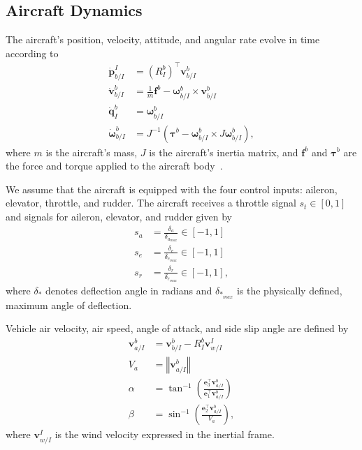 \documentclass{article}
\newcommand{\norm}[1]{\left\Vert{#1}\right\Vert}
\begin{document}
\begin{appendices}
	
\section{Aircraft Dynamics}
\label{sec:dynamics}

The aircraft's position, velocity, attitude, and angular rate evolve in time according to
\begin{align}
\dot{\mathbf{p}}_{b/I}^{I} & =\left(R_{I}^{b}\right)^{\top}\mathbf{v}_{b/I}^{b}\label{eq:lqr_pdot_true}\\
\dot{\mathbf{v}}_{b/I}^{b} & =\frac{1}{m}\mathbf{f}^{b}-\boldsymbol{\omega}_{b/I}^{b}\times\mathbf{v}_{b/I}^{b}\label{eq:lqr_vdot_true}\\
\dot{\mathbf{q}}_{I}^{b} & =\boldsymbol{\omega}_{b/I}^{b}\label{eq:lqr_qdot_true}\\
\dot{\boldsymbol{\omega}}_{b/I}^{b} & =J^{-1}\left(\boldsymbol{\tau}^{b}-\boldsymbol{\omega}_{b/I}^{b}\times J\boldsymbol{\omega}_{b/I}^{b}\right),\label{eq:lqr_omegadot_true}
\end{align}
where $m$ is the aircraft's mass, $J$ is the aircraft's inertia matrix, and $\mathbf{f}^b$ and $\boldsymbol{\tau}^b$ are the force and torque applied to the aircraft body~\cite{beard2012small}.

We assume that the aircraft is equipped with the four control inputs: aileron, elevator, throttle, and rudder.
The aircraft receives a throttle signal $s_t\in\left[0,1\right]$ and signals for aileron, elevator, and rudder given by
\begin{align}
s_{a} &= \frac{\delta_{a}}{\delta_{a_{max}}}\in\left[-1,1\right] \\
s_{e} &= \frac{\delta_{e}}{\delta_{e_{max}}}\in\left[-1,1\right] \\
s_{r} &= \frac{\delta_{r}}{\delta_{r_{max}}}\in\left[-1,1\right],
\end{align}
where $\delta_*$ denotes deflection angle in radians and $\delta_{*_{max}}$ is the physically defined, maximum angle of deflection.

Vehicle air velocity, air speed, angle of attack, and side slip angle are defined by
\begin{align}
\mathbf{v}_{a/I}^{b} & =\mathbf{v}_{b/I}^{b}-R_{I}^{b}\mathbf{v}_{w/I}^{I}\\
V_{a} & =\norm{\mathbf{v}_{a/I}^{b}} \\
\alpha & =\tan^{-1}\left(\frac{\mathbf{e}_{3}^{\top}\mathbf{v}_{a/I}^{b}}{\mathbf{e}_{1}^{\top}\mathbf{v}_{a/I}^{b}}\right)\\
\beta & =\sin^{-1}\left(\frac{\mathbf{e}_{2}^{\top}\mathbf{v}_{a/I}^{b}}{V_{a}}\right),
\end{align}
where $\mathbf{v}_{w/I}^I$ is the wind velocity expressed in the inertial frame.


\end{appendices}
\end{document}
